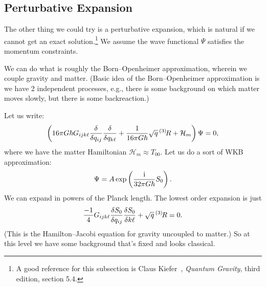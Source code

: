 \subsection{Perturbative Expansion}

The other thing we could try is a perturbative expansion, which is
natural if we cannot get an exact solution.\footnote{A good reference
for this subsection is Claus Kiefer~\cite{Kiefer:2004xyv}, \emph{Quantum Gravity}, third
edition, section 5.4.} We assume the wave
functional $\Psi$ satisfies the momentum constraints.

We can do what is roughly the Born--Openheimer approximation, wherein we
couple gravity and matter. (Basic idea of the Born--Openheimer
approximation is we have 2 independent processes, e.g., there is some
background on which matter moves slowly, but there is some
backreaction.)

Let us write:
\begin{equation}
\left(16\pi G\hbar G_{ijk\ell}\frac{\delta}{\delta q_{ij}}\frac{\delta}{\delta q_{k\ell}}
+\frac{1}{16\pi G\hbar}\sqrt{q}\,{{}^{(3)}\!R} + \mathcal{H}_{m}\right)\Psi = 0,
\end{equation}
where we have the matter Hamiltonian $\mathcal{H}_{m}\approx T_{00}$.
Let us do a sort of WKB approximation:
\begin{equation}
\Psi = A\exp\left(\frac{\mathrm{i}}{32\pi G\hbar}S_{0}\right).
\end{equation}
We can expand in powers of the Planck length.
The lowest order expansion is just
\begin{equation}\label{eq:2009-04-24:perturbative-expansion-wd:zeroeth-order}
\frac{-1}{4}G_{ijk\ell}\frac{\delta S_{0}}{\delta q_{ij}}\frac{\delta S_{0}}{\delta k\ell}
+\sqrt{q}\,{{}^{(3)}\!R} = 0.
\end{equation}
(This is the Hamilton--Jacobi equation for gravity uncoupled to matter.)
So at this level we have some background that's fixed and looks
classical.


